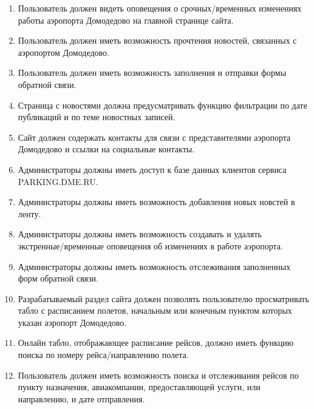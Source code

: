 \begin{enumerate}
    \item Пользователь должен видеть оповещения о
          срочных/временных изменениях работы аэропорта
          Домодедово на главной странице сайта.

    \item Пользователь должен иметь возможность прочтения
          новостей, связанных с аэропортом Домодедово.

    \item Пользователь должен иметь возможность заполнения
          и отправки формы обратной связи.

    \item Страница с новостями должна предусматривать
          функцию фильтрации по дате публикаций и по
          теме новостных записей.

    \item Сайт должен содержать контакты для связи с
          представителями аэропорта Домодедово и ссылки
          на социальные контакты.

    \item Администраторы должны иметь доступ к базе
          данных клиентов сервиса PARKING.DME.RU.

    \item Администраторы должны иметь возможность
          добавления новых новстей в ленту.

    \item Администраторы должны иметь возможность
          создавать и удалять экстренные/временные
          оповещения об изменениях в работе аэропорта.

    \item Администраторы должны иметь возможность
          отслеживания заполненных форм обратной связи.

    \item Разрабатываемый раздел сайта должен позволять
          пользователю просматривать табло с расписанием
          полетов, начальным или конечным пунктом которых
          указан аэропорт Домодедово.

    \item Онлайн табло, отображающее расписание рейсов,
          должно иметь функцию поиска по номеру
          рейса/направлению полета.

    \item Пользователь должен иметь возможность поиска
          и отслеживания рейсов по пункту назначения,
          авиакомпании, предоставляющей услуги, или
          направлению, и дате отправления.


\end{enumerate}
